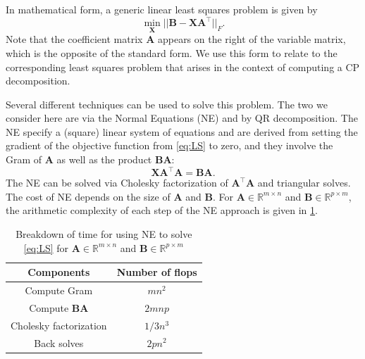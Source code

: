 \documentclass{article}
\newcommand{\mat}[1]{\mathbf{#1}}
\begin{document}
In mathematical form, a generic linear least squares problem is given by 
\begin{equation}
\label{eq:LS}
\min_{\mat{X}}||\mat{B} - \mat{X}\mat{A}^\top||_{F}.
\end{equation}
Note that the coefficient matrix $\mat{A}$ appears on the right of the variable matrix, which is the opposite of the standard form.
We use this form to relate to the corresponding least squares problem that arises in the context of computing a CP decomposition.

Several different techniques can be used to solve this problem.
The two we consider here are via the Normal Equations (NE) and by QR decomposition.
The NE specify a (square) linear system of equations and are derived from setting the gradient of the objective function from \cref{eq:LS} to zero, and they involve the Gram of $\mat{A}$ as well as the product $\mat{B}\mat{A}$:
\begin{equation}
\label{eq:NE}
\mat{X}\mat{A}^\top\mat{A} = \mat{B}\mat{A}.
\end{equation}
The NE can be solved via Cholesky factorization of $\mat{A}^\top\mat{A}$ and triangular solves.
The cost of NE depends on the size of $\mat{A}$ and $\mat{B}$. 
For $\mat{A} \in \mathbb{R}^{m \times n}$ and $\mat{B} \in \mathbb{R}^{p \times m}$, the arithmetic complexity of each step of the NE approach is given in \cref{tab:NE-time}.
\begin{table}[!ht]
  \centering
  \begin{tabular}{|c|c|}
    \hline
    Components & Number of flops\\
    \hline
    Compute Gram & $mn^2$ \\
    Compute $\mat{B}\mat{A}$ & $2mnp$\\
    Cholesky factorization & $1/3n^3$ \\
    Back solves & $2pn^2$ \\
    \hline
  \end{tabular}
  \caption{Breakdown of time for using NE to solve \cref{eq:LS} for $\mat{A} \in \mathbb{R}^{m \times n}$ and $\mat{B} \in \mathbb{R}^{p \times m}$}
  \label{tab:NE-time}
\end{table}
\end{document}
